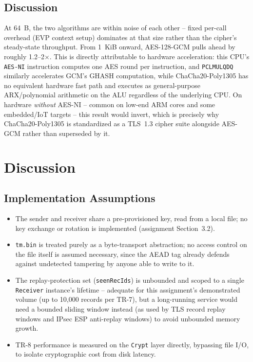 \documentclass[11pt]{article}
\begin{document}
\subsection*{Discussion}
At 64~B, the two algorithms are within noise of each other -- fixed per-call overhead
(EVP context setup) dominates at that size rather than the cipher's steady-state
throughput. From 1~KiB onward, AES-128-GCM pulls ahead by roughly 1.2--2$\times$. This is
directly attributable to hardware acceleration: this CPU's \texttt{AES-NI} instruction
computes one AES round per instruction, and \texttt{PCLMULQDQ} similarly accelerates
GCM's GHASH computation, while ChaCha20-Poly1305 has no equivalent hardware fast path
and executes as general-purpose ARX/polynomial arithmetic on the ALU regardless of the
underlying CPU. On hardware \emph{without} AES-NI -- common on low-end ARM cores and
some embedded/IoT targets -- this result would invert, which is precisely why
ChaCha20-Poly1305 is standardized as a TLS~1.3 cipher suite alongside AES-GCM rather
than superseded by it.

\section{Discussion}
\label{sec:discussion}

\subsection*{Implementation Assumptions}
\begin{itemize}[leftmargin=1.2cm]
\item The sender and receiver share a pre-provisioned key, read from a local file; no
key exchange or rotation is implemented (assignment Section~3.2).
\item \texttt{tm.bin} is treated purely as a byte-transport abstraction; no access
control on the file itself is assumed necessary, since the AEAD tag already defends
against undetected tampering by anyone able to write to it.
\item The replay-protection set (\texttt{seenRecIds}) is unbounded and scoped to a
single \texttt{Receiver} instance's lifetime -- adequate for this assignment's
demonstrated volume (up to 10{,}000 records per TR-7), but a long-running service would
need a bounded sliding window instead (as used by TLS record replay windows and IPsec
ESP anti-replay windows) to avoid unbounded memory growth.
\item TR-8 performance is measured on the \texttt{Crypt} layer directly, bypassing file
I/O, to isolate cryptographic cost from disk latency.
\end{itemize}
\end{document}
